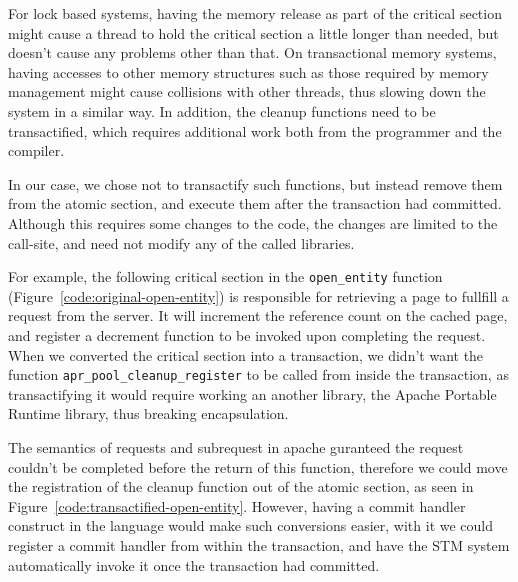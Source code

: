 \documentclass[preprint,11pt]{sigplanconf}
\begin{document}
For lock based systems, having the memory release as part of the critical
section might cause a thread to hold the critical section a little longer than
needed, but doesn't cause any problems other than that. On transactional memory
systems, having accesses to other memory structures such as those required by
memory management might cause collisions with other threads, thus slowing down
the system in a similar way. In addition, the cleanup functions need to be
transactified, which requires additional work both from the programmer and the
compiler.

In our case, we chose not to transactify such functions, but instead remove them
from the atomic section, and execute them after the transaction had committed.
Although this requires some changes to the code, the changes are limited to the
call-site, and need not modify any of the called libraries.

For example, the following critical section in the {\tt open\_entity} function
(Figure~\ref{code:original-open-entity}) is responsible for retrieving a page
to fullfill a request from the server. It will increment the reference count on
the cached page, and register a decrement function to be invoked upon completing
the request. When we converted the critical section into a transaction, we
didn't want the function {\tt apr\_pool\_cleanup\_register} to be called from
inside the transaction, as transactifying it would require working an another
library, the Apache Portable Runtime library, thus breaking encapsulation.

The semantics of requests and subrequest in apache guranteed the request
couldn't be completed before the return of this function, therefore we could
move the registration of the cleanup function out of the atomic section, as seen
in Figure~\ref{code:transactified-open-entity}. However, having a commit
handler construct in the language would make such conversions easier, with it we
could register a commit handler from within the transaction, and have the STM
system automatically invoke it once the transaction had committed.
\end{document}
